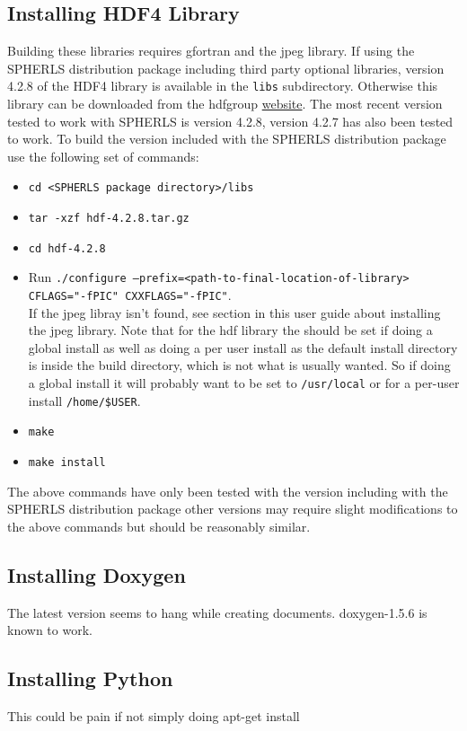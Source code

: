 \documentclass[12pt,a4paper]{book}
\begin{document}
\subsection{Installing HDF4 Library}
Building these libraries requires gfortran and the jpeg library. If using the SPHERLS distribution package including third party optional libraries, version 4.2.8 of the HDF4 library is available in the {\tt libs} subdirectory. Otherwise this library can be downloaded from the hdfgroup \href{http://www.hdfgroup.org/ftp/HDF/HDF_Current/src/}{website}. The most recent version tested to work with SPHERLS is version 4.2.8, version 4.2.7 has also been tested to work. To build the version included with the SPHERLS distribution package use the following set of commands:
\begin{itemize}
\item {\tt cd <SPHERLS package directory>/libs}
\item {\tt tar -xzf hdf-4.2.8.tar.gz}
\item {\tt cd hdf-4.2.8}
\item Run {\tt ./configure --prefix=<path-to-final-location-of-library> CFLAGS="-fPIC" CXXFLAGS="-fPIC"}.\\ If the jpeg libray isn't found, see section in this user guide about installing the jpeg library. Note that for the hdf library the {\tt <path-to-final-location-of-library>} should be set if doing a global install as well as doing a per user install as the default install directory is inside the build directory, which is not what is usually wanted. So if doing a global install it will probably want to be set to {\tt /usr/local} or for a per-user install {\tt /home/\$USER}.
\item {\tt make}
\item {\tt make install}
\end{itemize}
The above commands have only been tested with the version including with the SPHERLS distribution package other versions may require slight modifications to the above commands but should be reasonably similar.

\subsection{Installing Doxygen}
The latest version seems to hang while creating documents. doxygen-1.5.6 is known to work.

\subsection{Installing Python}
This could be pain if not simply doing apt-get install
\end{document}

